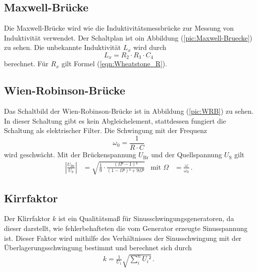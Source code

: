     \subsection{Maxwell-Brücke}
    Die Maxwell-Brücke wird wie die Induktivitätsmessbrücke zur Messung von Induktivität verwendet. Der Schaltplan ist oin Abbildung (\ref{pic:Maxwell-Bruecke}) zu sehen. 
     Die unbekannte Induktivität $L_x$ wird durch 
    \begin{equation}
        \label{eqn:Induktivität_L_Maxwell}
        L_x = R_2 \cdot R_3 \cdot C_4 
    \end{equation}
    berechnet. Für $R_x$ gilt Formel (\ref{eqn:Wheatstone_R}). 
    \subsection{Wien-Robinson-Brücke}
    Das Schaltbild der Wien-Robinson-Brücke ist in Abbildung (\ref{pic:WRB}) zu sehen. In dieser Schaltung gibt es kein Abgleichelement, stattdessen fungiert die 
    Schaltung als elektrischer Filter. Die Schwingung mit der Frequenz 
    \begin{equation}
        \omega_0 = \frac{1}{R \cdot C}
        \label{eqn:omega_0}
    \end{equation}
   wird geschwächt. Mit der Brückenspannung $U_{\text{Br}}$ und der Quellspannung $U_{\text{S}}$ gilt
    \begin{align}
    \left| \frac{U_{\text{Br}}}{U_{\text{S}}}\right| &= \sqrt{\frac{1}{9} \cdot \frac{(\Omega² - 1)²}{(1-\Omega²)² + 9\Omega²}} & \text{mit} \,\, \Omega &= \frac{\omega}{\omega_0} \, .
    \label{eqn:Omega}
    \end{align}

    \subsection{Kirrfaktor}
    Der Klirrfaktor $k$ ist ein Qualitätsmaß für Sinusschwingungsgeneratoren, da dieser darstellt, wie fehlerbehafteten die vom Generator erzeugte Sinusspannung ist. 
    Dieser Faktor wird mithilfe des Verhältnisses der Sinusschwingung mit der Überlagerungsschwingung bestimmt und berechnet sich durch 
    \begin{align}
        k = \frac{1}{U_1} \sqrt{\sum_i ^n {{U_i}²}} \, .
    \label{eqn:Klirrfaktor}
    \end{align}
    
